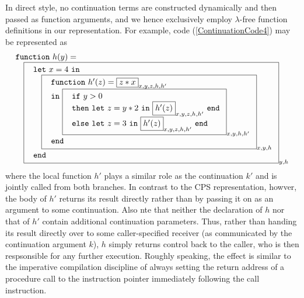 In direct style, no continuation terms are constructed dynamically and
then passed as function arguments, and we hence exclusively employ
$\lambda$-free function definitions in our representation. For
example, code (\ref{ContinuationCode4}) may be represented as
\begin{equation}
\label{DirectStyleCode1}
\begin{array}{l}
\mathtt{function}\ h (y) =\\
\quad
  \fbox{
    $\begin{array}{l}
       \mathtt{let}\ x=4\ \mathtt{in} \\
       \quad \fbox{
               $\begin{array}{l}
                  \mathtt{function}\ h' (z) = \fbox{$z*x$}_{x,y,z,h,h'} \\
                  \mathtt{in}\
                    \fbox{
                     $\begin{array}[t]{l}
                        \mathtt{if}\ y>0\\
                        \mathtt{then\ let}\ z = y*2\ \mathtt{in}\ 
                              \fbox{$h'(z)$}_{x,y,z,h,h'}\ \mathtt{end}\\
                        \mathtt{else\ let}\ z = 3\ \mathtt{in}\ 
                              \fbox{$h'(z)$}_{x,y,z,h,h'}\ \mathtt{end}
                      \end{array}$}_{x,y,h,h'}\\
                  \mathtt{end}
                \end{array}$}_{x,y,h}\\
       \mathtt{end}
     \end{array}$}_{y, h}
\end{array}
\end{equation}
where the local function $h'$ plays a similar role as the continuation
$k'$ and is jointly called from both branches. In contrast to the CPS
representation, howver, the body of $h'$ returns its result directly
rather than by passing it on as an argument to some continuation. Also
nte that neither the declaration of $h$ nor that of $h'$ contain
additional continuation parameters. Thus, rather than handing its
result directly over to some caller-specified receiver (as
communicated by the continuation argument $k$), $h$ simply returns
control back to the caller, who is then respsonsible for any further
execution. Roughly speaking, the effect is similar to the imperative
compilation discipline of always setting the return address of a
procedure call to the instruction pointer immediately following the
call instruction.

